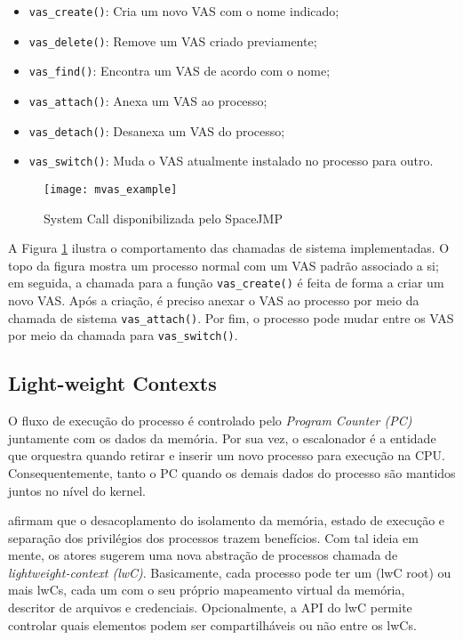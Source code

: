 \begin{itemize}
  \item \texttt{vas\_create()}: Cria um novo VAS com o nome indicado;
  \item \texttt{vas\_delete()}: Remove um VAS criado previamente;
  \item \texttt{vas\_find()}: Encontra um VAS de acordo com o nome;
  \item \texttt{vas\_attach()}: Anexa um VAS ao processo;
  \item \texttt{vas\_detach()}: Desanexa um VAS do processo;
  \item \texttt{vas\_switch()}: Muda o VAS atualmente instalado no processo para outro.
\end{itemize}

\begin{figure}[!h]
  \centering
  \texttt{[image: mvas\_example]} 
	\caption[System Call disponibilizada pelo SpaceJMP]{System Call disponibilizada pelo SpaceJMP \cite{ellarge}}
  \label{fig:mvas_example}
\end{figure}

A Figura \ref{fig:mvas_example} ilustra o comportamento das chamadas de sistema
implementadas. O topo da figura mostra um processo normal com um VAS padrão
associado a si; em seguida, a chamada para a função \texttt{vas\_create()} é
feita de forma a criar um novo VAS. Após a criação, é preciso anexar o VAS ao
processo por meio da chamada de sistema \texttt{vas\_attach()}. Por fim, o
processo pode mudar entre os VAS por meio da chamada para
\texttt{vas\_switch()}.

\subsection{Light-weight Contexts}
\label{sec:lwc}

O fluxo de execução do processo é controlado pelo \textit{Program Counter (PC)}
juntamente com os dados da memória. Por sua vez, o escalonador é a entidade que
orquestra quando retirar e inserir um novo processo para execução na CPU. Consequentemente,
tanto o PC quando os demais dados do processo são mantidos juntos no nível do
kernel.

\citet{litton} afirmam que o desacoplamento do isolamento da memória, estado de
execução e separação dos privilégios dos processos trazem benefícios. Com tal
ideia em mente, os atores sugerem uma nova abstração de processos chamada de
\textit{lightweight-context (lwC)}. Basicamente, cada processo pode ter um
(lwC root) ou mais lwCs, cada um com o seu próprio mapeamento
virtual da memória, descritor de arquivos e credenciais. Opcionalmente, a API
do lwC permite controlar quais elementos podem ser compartilháveis ou não entre
os lwCs.

